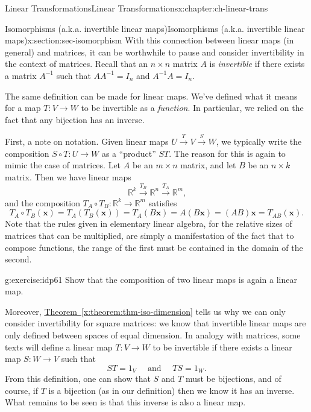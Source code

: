 \documentclass[oneside,10pt,]{book}
\newcommand{\xreffont}{\relax}
\numberwithin{equation}{section}
\newcommand{\R}{\mathbb{R}}
\newcommand{\xx}{\mathbf{x}}
\begin{document}
\begin{chapterptx}{Linear Transformations}{}{Linear Transformations}{}{}{x:chapter:ch-linear-trans}
\begin{sectionptx}{Isomorphisms (a.k.a. invertible linear maps)}{}{Isomorphisms (a.k.a. invertible linear maps)}{}{}{x:section:sec-isomorphism}
With this connection between linear maps (in general) and matrices, it can be worthwhile to pause and consider invertibility in the context of matrices. Recall that an \(n\times n\) matrix \(A\) is \emph{invertible} if there exists a matrix \(A^{-1}\) such that \(AA^{-1}=I_n\) and \(A^{-1}A=I_n\).%
\par
The same definition can be made for linear maps. We've defined what it means for a map \(T:V\to W\) to be invertible as a \emph{function}. In particular, we relied on the fact that any bijection has an inverse.%
\par
First, a note on notation. Given linear maps \(U\xrightarrow{T} V\xrightarrow{S} W\), we typically write the composition \(S\circ T:U\to W\) as a ``product'' \(ST\). The reason for this is again to mimic the case of matrices. Let \(A\) be an \(m\times n\) matrix, and let \(B\) be an \(n\times k\) matrix. Then we have linear maps%
\begin{equation*}
\R^k \xrightarrow{T_B} \R^n\xrightarrow{T_A} \R^m\text{,}
\end{equation*}
and the composition \(T_A\circ T_B:\R^k\to \R^m\) satisfies%
\begin{equation*}
T_A\circ T_B(\xx) = T_A(T_B(\xx)) = T_A(B\xx)=A(B\xx)=(AB)\xx=T_{AB}(\xx)\text{.}
\end{equation*}
Note that the rules given in elementary linear algebra, for the relative sizes of matrices that can be multiplied, are simply a manifestation of the fact that to compose functions, the range of the first must be contained in the domain of the second.%
\begin{inlineexercise}{}{g:exercise:idp61}%
Show that the composition of two linear maps is again a linear map.%
\end{inlineexercise}%
Moreover, \hyperref[x:theorem:thm-iso-dimension]{Theorem~{\xreffont\ref{x:theorem:thm-iso-dimension}}} tells us why we can only consider invertibility for square matrices: we know that invertible linear maps are only defined between spaces of equal dimension. In analogy with matrices, some texts will define a linear map \(T:V\to W\) to be invertible if there exists a linear map \(S:W\to V\) such that%
\begin{equation*}
ST = 1_V \quad \text{ and } \quad TS = 1_W\text{.}
\end{equation*}
From this definition, one can show that \(S\) and \(T\) must be bijections, and of course, if \(T\) is a bijection (as in our definition) then we know it has an inverse. What remains to be seen is that this inverse is also a linear map.%

\end{sectionptx}
\end{chapterptx}
\end{document}
